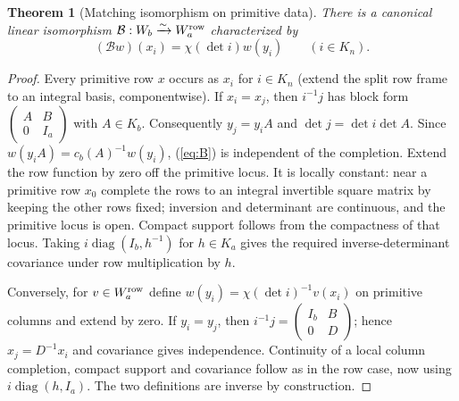 \documentclass[11pt]{article}
\newtheorem{theorem}{Theorem}[section]
\theoremstyle{remark}\newtheorem{remark}[theorem]{Remark}
\newcommand{\Match}{\mathcal B}
\begin{document}
\begin{theorem}[Matching isomorphism on primitive data]\label{thm:iso}
There is a canonical linear isomorphism $\Match:W_b\xrightarrow{\sim} W_a^{\rm row}$ characterized by
\begin{equation}\label{eq:B}
 (\Match w)(x_i)=\chi(\det i)w(y_i)\qquad(i\in K_n).
\end{equation}
\end{theorem}
\begin{proof}
Every primitive row $x$ occurs as $x_i$ for $i\in K_n$ (extend the split row frame to an integral basis, componentwise). If $x_i=x_j$, then $i^{-1}j$ has block form $\begin{pmatrix}A&B\\0&I_a\end{pmatrix}$ with $A\in K_b$. Consequently $y_j=y_i A$ and $\det j=\det i\det A$. Since $w(y_i A)=c_b(A)^{-1}w(y_i)$, (\ref{eq:B}) is independent of the completion. Extend the row function by zero off the primitive locus. It is locally constant: near a primitive row $x_0$ complete the rows to an integral invertible square matrix by keeping the other rows fixed; inversion and determinant are continuous, and the primitive locus is open. Compact support follows from the compactness of that locus. Taking $i\operatorname{diag}(I_b,h^{-1})$ for $h\in K_a$ gives the required inverse-determinant covariance under row multiplication by $h$.

Conversely, for $v\in W_a^{\rm row}$ define $w(y_i)=\chi(\det i)^{-1}v(x_i)$ on primitive columns and extend by zero. If $y_i=y_j$, then $i^{-1}j=\begin{pmatrix}I_b&B\\0&D\end{pmatrix}$; hence $x_j=D^{-1}x_i$ and covariance gives independence. Continuity of a local column completion, compact support and covariance follow as in the row case, now using $i\operatorname{diag}(h,I_a)$. The two definitions are inverse by construction.
\end{proof}
\end{document}
